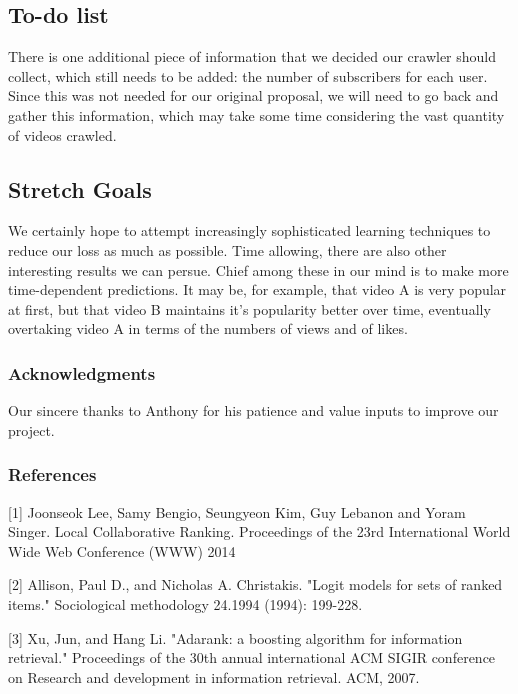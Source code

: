\documentclass{article} %
\begin{document}
	\subsection{To-do list}
	There is one additional piece of information that we decided our crawler should collect, which still needs to be added: the number of subscribers for each user.  Since this was not needed for our original proposal, we will need to go back and gather this information, which may take some time considering the vast quantity of videos crawled.

	\subsection{Stretch Goals}
	We certainly hope to attempt increasingly sophisticated learning techniques to reduce our loss as much as possible.  Time allowing, there are also other interesting results we can persue.  Chief among these in our mind is to make more time-dependent predictions.  It may be, for example, that video A is very popular at first, but that video B maintains it's popularity better over time, eventually overtaking video A in terms of the numbers of views and of likes.

\subsubsection*{Acknowledgments}

Our sincere thanks to Anthony for his patience and value inputs to improve our project.

\subsubsection*{References}
\small{
[1] Joonseok Lee, Samy Bengio, Seungyeon Kim, Guy Lebanon and Yoram Singer. Local Collaborative Ranking. Proceedings of the 23rd International World Wide Web Conference (WWW) 2014

[2] Allison, Paul D., and Nicholas A. Christakis. "Logit models for sets of ranked items." Sociological methodology 24.1994 (1994): 199-228.

[3] Xu, Jun, and Hang Li. "Adarank: a boosting algorithm for information retrieval." Proceedings of the 30th annual international ACM SIGIR conference on Research and development in information retrieval. ACM, 2007.
}
\end{document}
